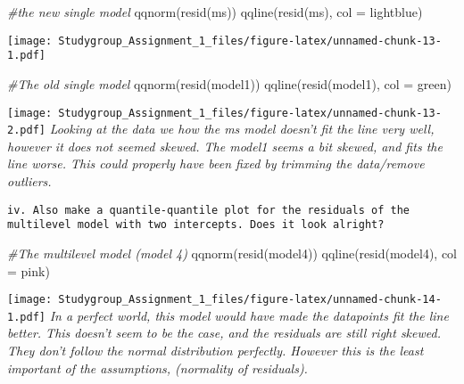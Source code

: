 \documentclass[
]{article}
\newenvironment{Shaded}{\begin{snugshade}}{\end{snugshade}}
\newcommand{\AttributeTok}[1]{\textcolor[rgb]{0.77,0.63,0.00}{#1}}
\newcommand{\CommentTok}[1]{\textcolor[rgb]{0.56,0.35,0.01}{\textit{#1}}}
\newcommand{\FunctionTok}[1]{\textcolor[rgb]{0.00,0.00,0.00}{#1}}
\newcommand{\NormalTok}[1]{#1}
\newcommand{\StringTok}[1]{\textcolor[rgb]{0.31,0.60,0.02}{#1}}
\begin{document}
\begin{Shaded}
\begin{Highlighting}[]
\CommentTok{\#the new single model }
\FunctionTok{qqnorm}\NormalTok{(}\FunctionTok{resid}\NormalTok{(ms))}
\FunctionTok{qqline}\NormalTok{(}\FunctionTok{resid}\NormalTok{(ms), }\AttributeTok{col =} \StringTok{\textquotesingle{}lightblue\textquotesingle{}}\NormalTok{)}
\end{Highlighting}
\end{Shaded}

\texttt{[image: Studygroup\_Assignment\_1\_files/figure-latex/unnamed-chunk-13-1.pdf]}

\begin{Shaded}
\begin{Highlighting}[]
\CommentTok{\#The old single model }
\FunctionTok{qqnorm}\NormalTok{(}\FunctionTok{resid}\NormalTok{(model1))}
\FunctionTok{qqline}\NormalTok{(}\FunctionTok{resid}\NormalTok{(model1), }\AttributeTok{col =} \StringTok{\textquotesingle{}green\textquotesingle{}}\NormalTok{)}
\end{Highlighting}
\end{Shaded}

\texttt{[image: Studygroup\_Assignment\_1\_files/figure-latex/unnamed-chunk-13-2.pdf]}
\emph{Looking at the data we how the ms model doesn't fit the line very
well, however it does not seemed skewed. The model1 seems a bit skewed,
and fits the line worse. This could properly have been fixed by trimming
the data/remove outliers.}

\begin{verbatim}
iv. Also make a quantile-quantile plot for the residuals of the  multilevel model with two intercepts. Does it look alright?
\end{verbatim}

\begin{Shaded}
\begin{Highlighting}[]
\CommentTok{\#The multilevel model (model 4)}
\FunctionTok{qqnorm}\NormalTok{(}\FunctionTok{resid}\NormalTok{(model4))}
\FunctionTok{qqline}\NormalTok{(}\FunctionTok{resid}\NormalTok{(model4), }\AttributeTok{col =} \StringTok{\textquotesingle{}pink\textquotesingle{}}\NormalTok{)}
\end{Highlighting}
\end{Shaded}

\texttt{[image: Studygroup\_Assignment\_1\_files/figure-latex/unnamed-chunk-14-1.pdf]}
\emph{In a perfect world, this model would have made the datapoints fit
the line better. This doesn't seem to be the case, and the residuals are
still right skewed. They don't follow the normal distribution perfectly.
However this is the least important of the assumptions, (normality of
residuals).}
\end{document}
